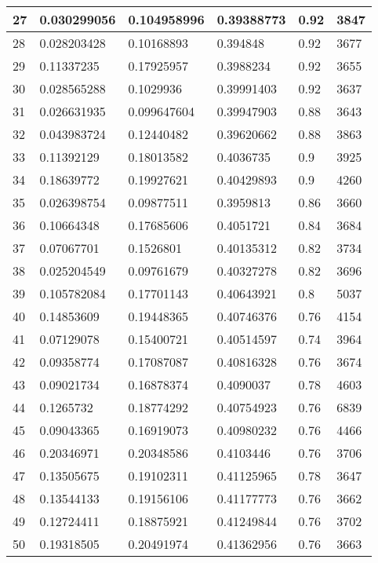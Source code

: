 \begin{longtable}{|l|l|l|l|l|l|}
27 & 0.030299056 & 0.104958996 & 0.39388773 & 0.92 & 3847 \\ \hline 
28 & 0.028203428 & 0.10168893 & 0.394848 & 0.92 & 3677 \\ \hline 
29 & 0.11337235 & 0.17925957 & 0.3988234 & 0.92 & 3655 \\ \hline 
30 & 0.028565288 & 0.1029936 & 0.39991403 & 0.92 & 3637 \\ \hline 
31 & 0.026631935 & 0.099647604 & 0.39947903 & 0.88 & 3643 \\ \hline 
32 & 0.043983724 & 0.12440482 & 0.39620662 & 0.88 & 3863 \\ \hline 
33 & 0.11392129 & 0.18013582 & 0.4036735 & 0.9 & 3925 \\ \hline 
34 & 0.18639772 & 0.19927621 & 0.40429893 & 0.9 & 4260 \\ \hline 
35 & 0.026398754 & 0.09877511 & 0.3959813 & 0.86 & 3660 \\ \hline 
36 & 0.10664348 & 0.17685606 & 0.4051721 & 0.84 & 3684 \\ \hline 
37 & 0.07067701 & 0.1526801 & 0.40135312 & 0.82 & 3734 \\ \hline 
38 & 0.025204549 & 0.09761679 & 0.40327278 & 0.82 & 3696 \\ \hline 
39 & 0.105782084 & 0.17701143 & 0.40643921 & 0.8 & 5037 \\ \hline 
40 & 0.14853609 & 0.19448365 & 0.40746376 & 0.76 & 4154 \\ \hline 
41 & 0.07129078 & 0.15400721 & 0.40514597 & 0.74 & 3964 \\ \hline 
42 & 0.09358774 & 0.17087087 & 0.40816328 & 0.76 & 3674 \\ \hline 
43 & 0.09021734 & 0.16878374 & 0.4090037 & 0.78 & 4603 \\ \hline 
44 & 0.1265732 & 0.18774292 & 0.40754923 & 0.76 & 6839 \\ \hline 
45 & 0.09043365 & 0.16919073 & 0.40980232 & 0.76 & 4466 \\ \hline 
46 & 0.20346971 & 0.20348586 & 0.4103446 & 0.76 & 3706 \\ \hline 
47 & 0.13505675 & 0.19102311 & 0.41125965 & 0.78 & 3647 \\ \hline 
48 & 0.13544133 & 0.19156106 & 0.41177773 & 0.76 & 3662 \\ \hline 
49 & 0.12724411 & 0.18875921 & 0.41249844 & 0.76 & 3702 \\ \hline 
50 & 0.19318505 & 0.20491974 & 0.41362956 & 0.76 & 3663 \\ \hline 
\end{longtable}
